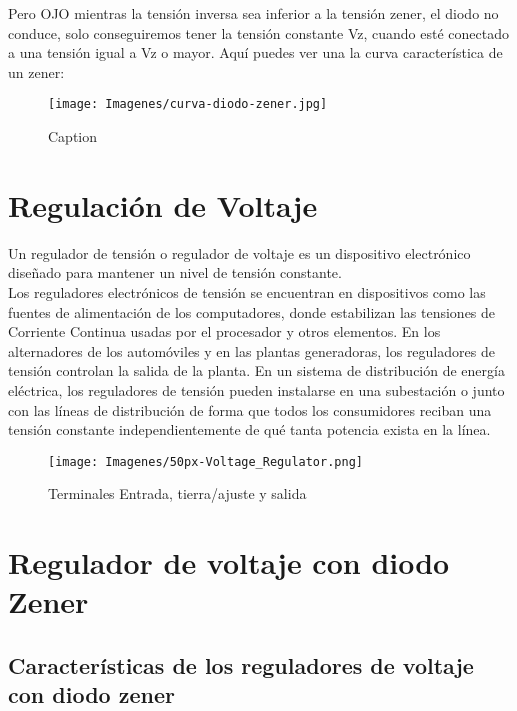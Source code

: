 \documentclass{article}
\begin{document}
 Pero OJO mientras la tensión inversa sea inferior a la tensión zener, el diodo no conduce, solo conseguiremos tener la tensión constante Vz, cuando esté conectado a una tensión igual a Vz o mayor. Aquí puedes ver una la curva característica de un zener:\citep{dZener}\\
 
 \begin{figure}[ht!]
     \centering
     \texttt{[image: Imagenes/curva-diodo-zener.jpg]}
     \caption{Caption}
     \label{fig:curvaZener}
 \end{figure}
 

\section{Regulación de Voltaje}

Un regulador de tensión o regulador de voltaje es un dispositivo electrónico diseñado para mantener un nivel de tensión constante.\citep{regTensWiki}\\

Los reguladores electrónicos de tensión se encuentran en dispositivos como las fuentes de alimentación de los computadores, donde estabilizan las tensiones de Corriente Continua usadas por el procesador y otros elementos. En los alternadores de los automóviles y en las plantas generadoras, los reguladores de tensión controlan la salida de la planta. En un sistema de distribución de energía eléctrica, los reguladores de tensión pueden instalarse en una subestación o junto con las líneas de distribución de forma que todos los consumidores reciban una tensión constante independientemente de qué tanta potencia exista en la línea.\citep{regTensWiki}\\

\begin{figure}[ht!]
    \centering
    \texttt{[image: Imagenes/50px-Voltage\_Regulator.png]}
    \caption{Terminales 	Entrada, tierra/ajuste y salida}
    \label{fig:simb}
\end{figure}

\section{Regulador de voltaje con diodo Zener}

\subsection{Características de los reguladores de voltaje con diodo zener}
\end{document}
